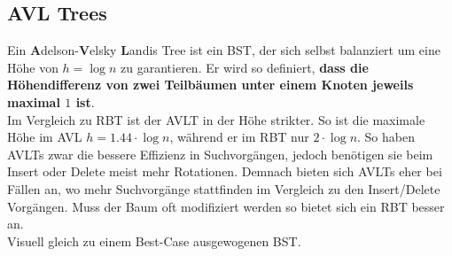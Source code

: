 \documentclass[
../../AuD-Zusammenfassung.tex,
]
{subfiles}
\begin{document}
\subsection{AVL Trees}
Ein \textbf{A}delson-\textbf{V}elsky \textbf{L}andis Tree ist ein BST, der sich selbst balanziert um eine Höhe von $h = \log n$ zu garantieren. Er wird so definiert, \textbf{dass die Höhendifferenz von zwei Teilbäumen unter einem Knoten jeweils maximal $1$ ist}.\\
Im Vergleich zu RBT ist der AVLT in der Höhe strikter. So ist die maximale Höhe im AVL $h = 1.44 \cdot \log n$, während er im RBT nur $2 \cdot \log n$. So haben AVLTs zwar die bessere Effizienz in Suchvorgängen, jedoch benötigen sie beim Insert oder Delete meist mehr Rotationen. Demnach bieten sich AVLTs eher bei Fällen an, wo mehr Suchvorgänge stattfinden im Vergleich zu den Insert/Delete Vorgängen. Muss der Baum oft modifiziert werden so bietet sich ein RBT besser an.\\

Visuell gleich zu einem Best-Case ausgewogenen BST. \\
\begin{minipage}[t]{0.5\textwidth}
    \centering
\end{minipage}
\end{document}
